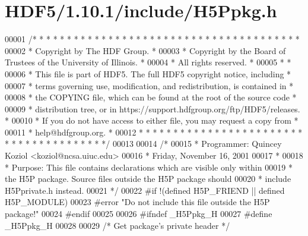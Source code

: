 \hypertarget{_h_d_f5_21_810_81_2include_2_h5_ppkg_8h_source}{}\section{H\+D\+F5/1.10.1/include/\+H5\+Ppkg.h}
\label{_h_d_f5_21_810_81_2include_2_h5_ppkg_8h_source}

\begin{DoxyCode}
00001 \textcolor{comment}{/* * * * * * * * * * * * * * * * * * * * * * * * * * * * * * * * * * * * * * *}
00002 \textcolor{comment}{ * Copyright by The HDF Group.                                               *}
00003 \textcolor{comment}{ * Copyright by the Board of Trustees of the University of Illinois.         *}
00004 \textcolor{comment}{ * All rights reserved.                                                      *}
00005 \textcolor{comment}{ *                                                                           *}
00006 \textcolor{comment}{ * This file is part of HDF5.  The full HDF5 copyright notice, including     *}
00007 \textcolor{comment}{ * terms governing use, modification, and redistribution, is contained in    *}
00008 \textcolor{comment}{ * the COPYING file, which can be found at the root of the source code       *}
00009 \textcolor{comment}{ * distribution tree, or in https://support.hdfgroup.org/ftp/HDF5/releases.  *}
00010 \textcolor{comment}{ * If you do not have access to either file, you may request a copy from     *}
00011 \textcolor{comment}{ * help@hdfgroup.org.                                                        *}
00012 \textcolor{comment}{ * * * * * * * * * * * * * * * * * * * * * * * * * * * * * * * * * * * * * * */}
00013 
00014 \textcolor{comment}{/*}
00015 \textcolor{comment}{ * Programmer:  Quincey Koziol <koziol@ncsa.uiuc.edu>}
00016 \textcolor{comment}{ *      Friday, November 16, 2001}
00017 \textcolor{comment}{ *}
00018 \textcolor{comment}{ * Purpose: This file contains declarations which are visible only within}
00019 \textcolor{comment}{ *      the H5P package.  Source files outside the H5P package should}
00020 \textcolor{comment}{ *      include H5Pprivate.h instead.}
00021 \textcolor{comment}{ */}
00022 \textcolor{preprocessor}{#if !(defined H5P\_FRIEND || defined H5P\_MODULE)}
00023 \textcolor{preprocessor}{#error "Do not include this file outside the H5P package!"}
00024 \textcolor{preprocessor}{#endif}
00025 
00026 \textcolor{preprocessor}{#ifndef \_H5Ppkg\_H}
00027 \textcolor{preprocessor}{#define \_H5Ppkg\_H}
00028 
00029 \textcolor{comment}{/* Get package's private header */}

\end{DoxyCode}
